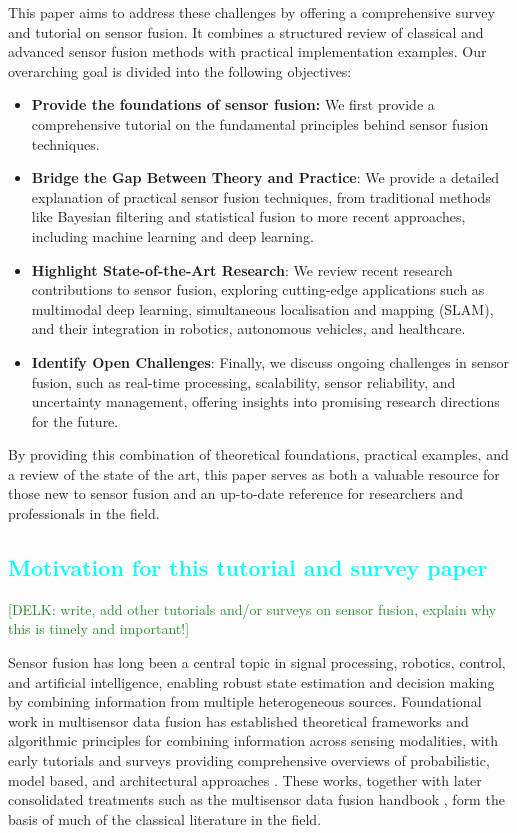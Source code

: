\documentclass[journal]{IEEEtran}
\newcommand{\TC}[1]{\textcolor{cyan}{{#1}}}
\newcommand{\KD}[1]{\textcolor{ForestGreen}{{#1}}}
\begin{document}
This paper aims to address these challenges by offering a comprehensive survey and tutorial on sensor fusion. It combines a structured review of classical and advanced sensor fusion methods with practical implementation examples. Our overarching goal is divided into the following objectives:
\begin{itemize}
    \item \textbf{Provide the foundations of sensor fusion:} We first provide a comprehensive tutorial on the fundamental principles behind sensor fusion techniques.
    \item \textbf{Bridge the Gap Between Theory and Practice}: We provide a detailed explanation of practical sensor fusion techniques, from traditional methods like Bayesian filtering and statistical fusion to more recent approaches, including machine learning and deep learning.
    \item \textbf{Highlight State-of-the-Art Research}: We review recent research contributions to sensor fusion, exploring cutting-edge applications such as multimodal deep learning, simultaneous localisation and mapping (SLAM), and their integration in robotics, autonomous vehicles, and healthcare.
    \item \textbf{Identify Open Challenges}: Finally, we discuss ongoing challenges in sensor fusion, such as real-time processing, scalability, sensor reliability, and uncertainty management, offering insights into promising research directions for the future.
\end{itemize}

By providing this combination of theoretical foundations, practical examples, and a review of the state of the art, this paper serves as both a valuable resource for those new to sensor fusion and an up-to-date reference for researchers and professionals in the field.

\subsection{\TC{Motivation for this tutorial and survey paper}}
\KD{[DELK: write, add other tutorials and/or surveys on sensor fusion, explain why this is timely and important!]}

Sensor fusion has long been a central topic in signal processing, robotics, control, and artificial intelligence, enabling robust state estimation and decision making by combining information from multiple heterogeneous sources. Foundational work in multisensor data fusion has established theoretical frameworks and algorithmic principles for combining information across sensing modalities, with early tutorials and surveys providing comprehensive overviews of probabilistic, model based, and architectural approaches \cite{hall_introduction_1997, luo_multisensor_1989}. These works, together with later consolidated treatments such as the multisensor data fusion handbook \cite{liggins_handbook_2009}, form the basis of much of the classical literature in the field.
\end{document}
